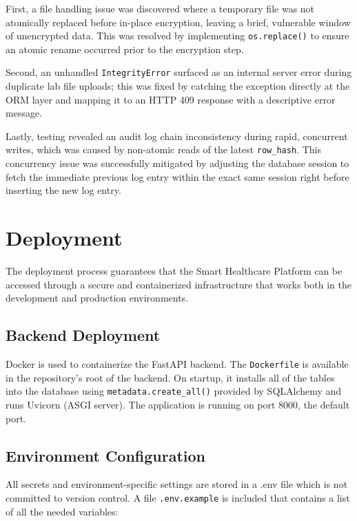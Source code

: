 \documentclass[a4paper,12pt]{report}
\begin{document}
First, a file handling issue was discovered where a temporary file was not atomically replaced before in-place encryption, leaving a brief, vulnerable window of unencrypted data. This was resolved by implementing \texttt{os.replace()} to ensure an atomic rename occurred prior to the encryption step. 

Second, an unhandled \texttt{IntegrityError} surfaced as an internal server error during duplicate lab file uploads; this was fixed by catching the exception directly at the ORM layer and mapping it to an HTTP 409 response with a descriptive error message. 

Lastly, testing revealed an audit log chain inconsistency during rapid, concurrent writes, which was caused by non-atomic reads of the latest \texttt{row\_hash}. This concurrency issue was successfully mitigated by adjusting the database session to fetch the immediate previous log entry within the exact same session right before inserting the new log entry.


\chapter{Deployment}

The deployment process guarantees that the Smart Healthcare Platform can be accessed through a secure and containerized infrastructure that works both in the development and production environments.

\section{Backend Deployment}

Docker is used to containerize the FastAPI backend. The \texttt{Dockerfile} is available in the repository's root of the backend. On startup, it installs all of the tables into the database using \texttt{metadata.create\_all()} provided by SQLAlchemy and runs Uvicorn (ASGI server). The application is running on port 8000, the default port.

\section{Environment Configuration}

All secrets and environment-specific settings are stored in a .env file which is not committed to version control. A file \texttt{.env.example} is included that contains a list of all the needed variables:
\end{document}
